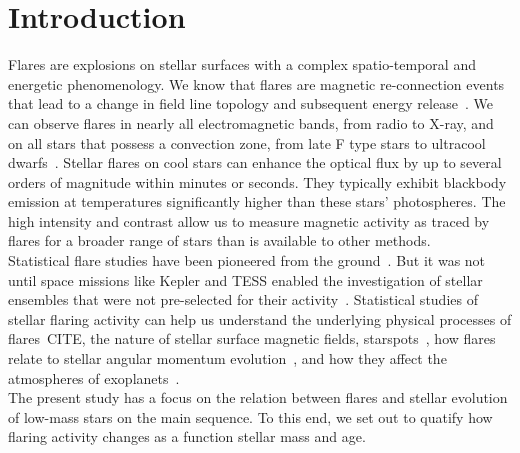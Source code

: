 \documentclass{aa}
\begin{document}
\section{Introduction}
Flares are explosions on stellar surfaces with a complex spatio-temporal and energetic phenomenology. We know that flares are magnetic re-connection events that lead to a change in field line topology and subsequent energy release~\citep{priest_magnetic_2002}. We can observe flares in nearly all electromagnetic bands, from radio %
to X-ray, and on all stars that possess a convection zone, from late F type stars to ultracool dwarfs~\citep{gizis2013}. 
Stellar flares on cool stars can enhance the optical flux by up to several orders of magnitude within minutes or seconds. They typically exhibit blackbody emission at temperatures significantly higher than these stars' photospheres. The high intensity and contrast allow us to measure magnetic activity as traced by flares for a broader range of stars than is available to other methods.
\\
Statistical flare studies have been pioneered from the ground~\citep{lacy_uv_1976}. But it was not until space missions like Kepler and TESS enabled the investigation of stellar ensembles that were not pre-selected for their activity~\citep{walkowicz2011}. Statistical studies of stellar flaring activity can help us understand the underlying physical processes of flares~CITE, the nature of stellar surface magnetic fields, starspots~\citep{davenport_flaresandspots_2015, howard_evryflare2arxiv_2019}, how flares relate to stellar angular momentum evolution~\citep{mondrik2019, howard_evryflare2arxiv_2019}, and how they affect the atmospheres of exoplanets~\citep{lecavelier_flareescape_2012, loyd_mflaresplanetsfuv_2018, tilley_repeated_flare_2019, howard2019}.%
\\
The present study has a focus on the relation between flares and stellar evolution of low-mass stars on the main sequence. To this end, we set out to quatify how flaring activity changes as a function stellar mass and age. 
\end{document}
